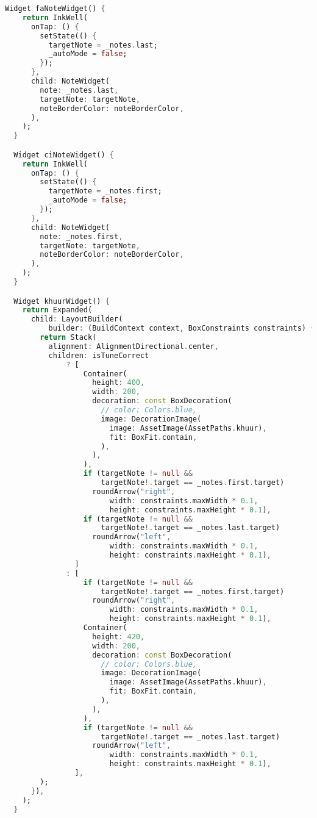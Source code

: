 \begin{lstlisting}[language=Dart, caption=Нүүр хуудсын зуралт ба хэрэгжүүлэлт, frame=single]
  Widget faNoteWidget() {
    return InkWell(
      onTap: () {
        setState(() {
          targetNote = _notes.last;
          _autoMode = false;
        });
      },
      child: NoteWidget(
        note: _notes.last,
        targetNote: targetNote,
        noteBorderColor: noteBorderColor,
      ),
    );
  }

  Widget ciNoteWidget() {
    return InkWell(
      onTap: () {
        setState(() {
          targetNote = _notes.first;
          _autoMode = false;
        });
      },
      child: NoteWidget(
        note: _notes.first,
        targetNote: targetNote,
        noteBorderColor: noteBorderColor,
      ),
    );
  }

  Widget khuurWidget() {
    return Expanded(
      child: LayoutBuilder(
          builder: (BuildContext context, BoxConstraints constraints) {
        return Stack(
          alignment: AlignmentDirectional.center,
          children: isTuneCorrect
              ? [
                  Container(
                    height: 400,
                    width: 200,
                    decoration: const BoxDecoration(
                      // color: Colors.blue,
                      image: DecorationImage(
                        image: AssetImage(AssetPaths.khuur),
                        fit: BoxFit.contain,
                      ),
                    ),
                  ),
                  if (targetNote != null &&
                      targetNote!.target == _notes.first.target)
                    roundArrow("right",
                        width: constraints.maxWidth * 0.1,
                        height: constraints.maxHeight * 0.1),
                  if (targetNote != null &&
                      targetNote!.target == _notes.last.target)
                    roundArrow("left",
                        width: constraints.maxWidth * 0.1,
                        height: constraints.maxHeight * 0.1),
                ]
              : [
                  if (targetNote != null &&
                      targetNote!.target == _notes.first.target)
                    roundArrow("right",
                        width: constraints.maxWidth * 0.1,
                        height: constraints.maxHeight * 0.1),
                  Container(
                    height: 420,
                    width: 200,
                    decoration: const BoxDecoration(
                      // color: Colors.blue,
                      image: DecorationImage(
                        image: AssetImage(AssetPaths.khuur),
                        fit: BoxFit.contain,
                      ),
                    ),
                  ),
                  if (targetNote != null &&
                      targetNote!.target == _notes.last.target)
                    roundArrow("left",
                        width: constraints.maxWidth * 0.1,
                        height: constraints.maxHeight * 0.1),
                ],
        );
      }),
    );
  }


\end{lstlisting}
